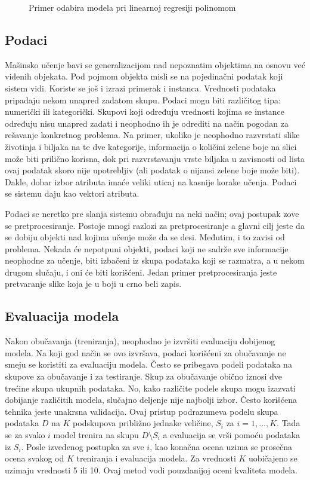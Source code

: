 \begin{figure}
	\centering
	\resizebox{.45\linewidth}{!}{}
	\resizebox{.45\linewidth}{!}{}
	\caption{Primer odabira modela pri linearnoj regresiji polinomom}
	\label{fig:odabir}
\end{figure}

\subsection{Podaci}

Mašinsko učenje bavi se generalizacijom nad nepoznatim objektima na osnovu već viđenih objekata. Pod pojmom objekta misli se na pojedinačni podatak koji sistem vidi. Koriste se još i izrazi primerak i instanca. Vrednosti podataka pripadaju nekom unapred zadatom skupu. Podaci mogu biti različitog tipa: numerički ili kategorički. Skupovi koji određuju vrednosti kojima se instance određuju nisu unapred zadati i neophodno ih je odrediti na način pogodan za rešavanje konkretnog problema. Na primer, ukoliko je neophodno razvrstati slike životinja i biljaka na te dve kategorije, informacija o količini zelene boje na slici može biti prilično korisna, dok pri razvrstavanju vrste biljaka u zavisnosti od lista ovaj podatak skoro nije upotrebljiv (ali podatak o nijansi zelene boje može biti). Dakle, dobar izbor atributa imaće veliki uticaj na kasnije korake učenja. Podaci se sistemu daju kao vektori atributa. \par

Podaci se neretko pre slanja sistemu obrađuju na neki način; ovaj postupak zove se pretprocesiranje. Postoje mnogi razlozi za pretprocesiranje a glavni cilj jeste da se dobiju objekti nad kojima učenje može da se desi. Međutim, i to zavisi od problema. Nekada će nepotpuni objekti, podaci koji ne sadrže sve informacije neophodne za učenje, biti izbačeni iz skupa podataka koji se razmatra, a u nekom drugom slučaju, i oni će biti korišćeni. Jedan primer pretprocesiranja jeste pretvaranje slike koja je u boji u crno beli zapis.

\subsection{Evaluacija modela}

Nakon obučavanja (treniranja), neophodno je izvršiti evaluaciju dobijenog modela. Na koji god način se ovo izvršava, podaci korišćeni za obučavanje ne smeju se koristiti za evaluaciju modela. Često se pribegava podeli podataka na skupove za obučavanje i za testiranje. Skup za obučavanje obično iznosi dve trećine skupa ukupnih podataka. No, kako različite podele skupa mogu izazvati dobijanje različitih modela, slučajno deljenje nije najbolji izbor.  Često korišćena tehnika jeste unakrsna validacija. Ovaj pristup podrazumeva podelu skupa podataka $D$ na $K$ podskupova približno jednake veličine, $S_i$ za $i=1,...,K$. Tada se za svako $i$ model trenira na skupu $D \setminus S_i$ a evaluacija se vrši pomoću podataka iz $S_i$. Posle izvedenog postupka za sve $i$, kao konačna ocena uzima se prosečna ocena svakog od $K$ treniranja i evaluacija modela. Za vrednosti $K$ uobičajeno se uzimaju vrednosti 5 ili 10. Ovaj metod vodi pouzdanijoj oceni kvaliteta modela.

